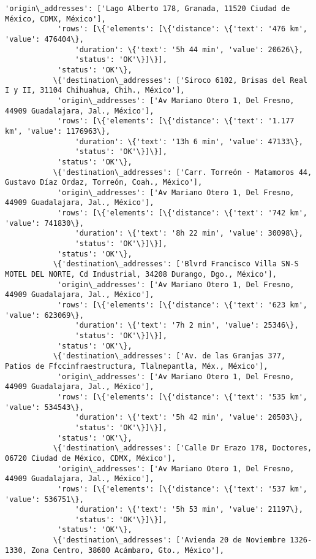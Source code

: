 \documentclass[11pt]{article}
\begin{document}
\begin{Verbatim}[commandchars=\\\{\}]
            'origin\_addresses': ['Lago Alberto 178, Granada, 11520 Ciudad de México, CDMX, México'],
            'rows': [\{'elements': [\{'distance': \{'text': '476 km', 'value': 476404\},
                'duration': \{'text': '5h 44 min', 'value': 20626\},
                'status': 'OK'\}]\}],
            'status': 'OK'\},
           \{'destination\_addresses': ['Siroco 6102, Brisas del Real I y II, 31104 Chihuahua, Chih., México'],
            'origin\_addresses': ['Av Mariano Otero 1, Del Fresno, 44909 Guadalajara, Jal., México'],
            'rows': [\{'elements': [\{'distance': \{'text': '1.177 km', 'value': 1176963\},
                'duration': \{'text': '13h 6 min', 'value': 47133\},
                'status': 'OK'\}]\}],
            'status': 'OK'\},
           \{'destination\_addresses': ['Carr. Torreón - Matamoros 44, Gustavo Díaz Ordaz, Torreón, Coah., México'],
            'origin\_addresses': ['Av Mariano Otero 1, Del Fresno, 44909 Guadalajara, Jal., México'],
            'rows': [\{'elements': [\{'distance': \{'text': '742 km', 'value': 741830\},
                'duration': \{'text': '8h 22 min', 'value': 30098\},
                'status': 'OK'\}]\}],
            'status': 'OK'\},
           \{'destination\_addresses': ['Blvrd Francisco Villa SN-S MOTEL DEL NORTE, Cd Industrial, 34208 Durango, Dgo., México'],
            'origin\_addresses': ['Av Mariano Otero 1, Del Fresno, 44909 Guadalajara, Jal., México'],
            'rows': [\{'elements': [\{'distance': \{'text': '623 km', 'value': 623069\},
                'duration': \{'text': '7h 2 min', 'value': 25346\},
                'status': 'OK'\}]\}],
            'status': 'OK'\},
           \{'destination\_addresses': ['Av. de las Granjas 377, Patios de Ffccinfraestructura, Tlalnepantla, Méx., México'],
            'origin\_addresses': ['Av Mariano Otero 1, Del Fresno, 44909 Guadalajara, Jal., México'],
            'rows': [\{'elements': [\{'distance': \{'text': '535 km', 'value': 534543\},
                'duration': \{'text': '5h 42 min', 'value': 20503\},
                'status': 'OK'\}]\}],
            'status': 'OK'\},
           \{'destination\_addresses': ['Calle Dr Erazo 178, Doctores, 06720 Ciudad de México, CDMX, México'],
            'origin\_addresses': ['Av Mariano Otero 1, Del Fresno, 44909 Guadalajara, Jal., México'],
            'rows': [\{'elements': [\{'distance': \{'text': '537 km', 'value': 536751\},
                'duration': \{'text': '5h 53 min', 'value': 21197\},
                'status': 'OK'\}]\}],
            'status': 'OK'\},
           \{'destination\_addresses': ['Avienda 20 de Noviembre 1326-1330, Zona Centro, 38600 Acámbaro, Gto., México'],

\end{Verbatim}
\end{document}
